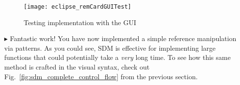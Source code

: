 \begin{itemize}
\vspace{0.5cm}

\begin{figure}[htp]
\begin{center}
  \texttt{[image: eclipse\_remCardGUITest]}
  \caption{Testing implementation with the GUI}
  \label{fig:GUITest}
\end{center}
\end{figure}

\vspace{0.5cm}

\item[$\blacktriangleright$] Fantastic work! You have now implemented a simple reference manipulation via patterns. As you could see, SDM is effective for
implementing large functions that could potentially take a \emph{very} long time. To see how this same method is crafted in the visual syntax, check out
Fig.~\ref{fig:sdm_complete_control_flow} from the previous section.

\end{itemize}
